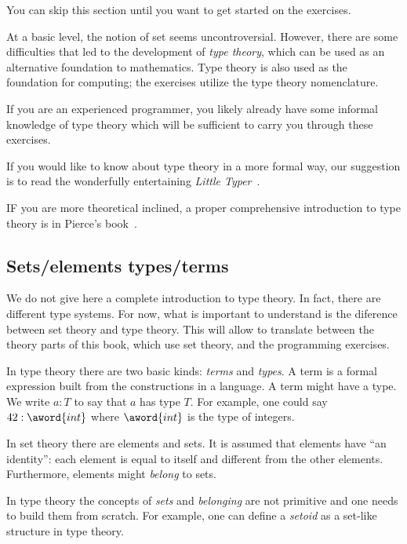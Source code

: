 
\begin{remark}
    You can skip this section until you want to get started on the exercises.
\end{remark}

At a basic level, the notion of set seems uncontroversial.
However, there are some difficulties that led to the development of \emph{type theory},
which can be used as an alternative foundation to mathematics.
Type theory is also used as the foundation for computing; the exercises utilize the type theory nomenclature.

If you are an experienced programmer, you likely already have some informal knowledge of type theory which will be sufficient to carry you through these exercises.

If you would like to know about type theory in a more formal way, our suggestion is to read the wonderfully entertaining \emph{Little Typer}~\cite{friedman2018little}.

IF you are more theoretical inclined, a proper comprehensive introduction to type theory is in Pierce's book~\cite{pierce02types}.

\subsection{Sets/elements \vs types/terms}
We do not give here a complete introduction to type theory.
In fact, there are different type systems.
For now, what is important to understand is the diference between set theory and type theory.
This will allow to translate between the theory parts of this book, which use set theory, and the programming exercises.

In type theory there are two basic kinds: \emph{terms} and \emph{types}.
A term is a formal expression built from the constructions in a language.
A term might have a type.
We write $a : T$ to say that $a$ has type $T$.
For example, one could say $42 : \aword{int}$ where $\aword{int}$ is the type of integers.

In set theory there are elements and sets.
It is assumed that elements have ``an identity'': each element is equal to itself and different from the other elements.
Furthermore, elements might \emph{belong} to sets.

In type theory the concepts of \emph{sets} and \emph{belonging} are not primitive and one needs to build them from scratch.
For example, one can define a \emph{setoid} as a set-like structure in type theory.

